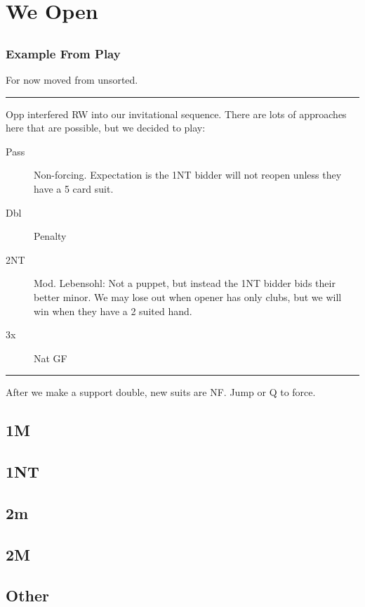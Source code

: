 \documentclass[tom-ari]{subfile}
\begin{document}
	
	\chapter{We Open}
	
	\section[1C]{}
	
	\section[1D]{}
	
	\subsection{Example From Play}
	
	For now moved from unsorted.
	
	\hrule
		
	
	Opp interfered RW into our invitational sequence. There are lots of approaches here that are possible, but we decided to play:
	\begin{description}
		\item[Pass] Non-forcing. Expectation is the 1NT bidder will not reopen unless they have a 5 card suit.
		\item[Dbl] Penalty
		\item[2NT] Mod. Lebensohl: Not a puppet, but instead the 1NT bidder bids their better minor. We may lose out when opener has only clubs, but we will win when they have a 2 suited hand.
		\item[3x] Nat GF
	\end{description}

	\hrule

After we make a support double, new suits are NF. Jump or Q to force.

	
	\section{1M}
	
	\section{1NT}
	
	\section{2m}
	
	\section{2M}
	
	\section{Other}
	
\end{document}
